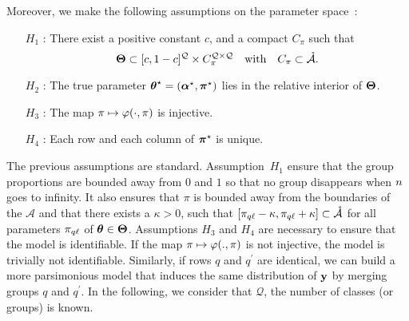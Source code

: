 \documentclass[]{imsart}
\newcommand{\1}{\mathds{1}}
\numberwithin{equation}{section}
\theoremstyle{plain}
\theoremstyle{remark}
\newtheorem{rem}[thm]{Remark}
\begin{document}
Moreover, we make the following assumptions on the parameter space~:
\begin{enumerate}
\item[$H_1$]: There exist a positive constant $c$, and a compact $C_\pi$ such that 
  \begin{equation*}
    \bTheta \subset [c, 1-c]^{\q} \times C_{\pi}^{\q \times \q} \quad \text{with} \quad C_\pi \subset \mathring{\mathcal{A}}.
  \end{equation*}
\item[$H_2$]: The true parameter $\boldsymbol{\theta}^\star = (\boldsymbol{\alpha}^\star, \boldsymbol{\pi}^\star)$ lies in the relative interior of $\boldsymbol{\Theta}$.
\item[$H_3$]: The map $\pi \mapsto \varphi(\cdot, \pi)$ is injective.
\item[$H_4$]: 
Each row and each column of $\boldsymbol{\pi}^\star$ is unique.
\end{enumerate}

The previous assumptions are standard. Assumption~$H_1$ ensure that the group proportions are bounded away from $0$ and $1$ so that no group disappears when $n$ goes to infinity. It also ensures that $\pi$ is bounded away from the boundaries of the $\mathcal{A}$ and that there exists a $\kappa>0$, such that $[\pi_{q \ell} - \kappa, \pi_{q \ell} + \kappa] \subset \mathring{\mathcal{A}}$ for all parameters $\pi_{q \ell}$ of $\boldsymbol{\theta} \in \boldsymbol{\Theta}$. Assumptions $H_3$ and $H_4$ are necessary to ensure that the model is identifiable. If the map $\pi \mapsto \varphi(., \pi)$ is not injective, the model is trivially not identifiable. Similarly, if rows $q$ and $q^\prime$ are identical, we can build a more parsimonious model that induces the same distribution of $\mathbf{y}$ by merging groups $q$ and $q^\prime$. In the following, we  consider that $\mathcal{Q}$, the number of classes (or groups) is known.
\end{document}
